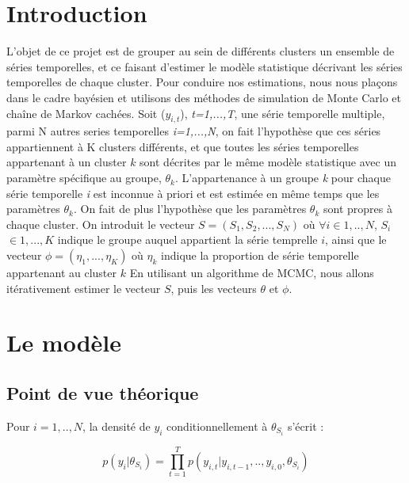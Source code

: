 \section{Introduction}
L'objet de ce projet est de grouper au sein de différents clusters un ensemble de séries temporelles, et ce faisant d'estimer le modèle statistique décrivant les séries temporelles de chaque cluster. 
Pour conduire nos estimations, nous nous plaçons dans le cadre bayésien et utilisons des méthodes de simulation de Monte Carlo et chaîne de Markov cachées.
\newline
Soit ($y_{i,t}$), \textit{t=1,...,T}, une série temporelle multiple, parmi N autres series temporelles \textit{i=1,...,N}, on fait l'hypothèse que ces séries appartiennent à K clusters différents, et que toutes les séries temporelles appartenant à un cluster $\textit{k}$ sont décrites par le même modèle statistique avec un paramètre spécifique au groupe, $\theta_k$. L'appartenance à un groupe \textit{k} pour chaque série temporelle \textit{i} est inconnue à priori et est estimée en même temps que les paramètres $\theta_k$. On fait de plus l'hypothèse que les paramètres $\theta_k$ sont propres à chaque cluster. 
\newline
On introduit le vecteur $S = (S_1,S_2,...,S_N)$ où $\forall i \in 1,..,N$, $S_i$ $\in 1,...,K$ indique le groupe auquel appartient la série temprelle $i$, ainsi que le vecteur $\phi = (\eta_1, ..., \eta_K)$ où $\eta_k$ indique la proportion de série temporelle appartenant au cluster $k$
\newline
En utilisant un algorithme de MCMC, nous allons itérativement estimer le vecteur $S$, puis les vecteurs $\theta$ et $\phi$.

\section{Le modèle}
\subsection{Point de vue théorique}

Pour $i = 1,..,N$, la densité de $y_i$ conditionnellement à $\theta_{S_i}$ s'écrit :

\begin{equation}
\textit{$p(y_i | \theta_{S_i})$} = \prod_{t=1}^{T} \textit{$p(y_{i,t}|y_{i,t-1},..,y_{i,0},\theta_{S_i})$}
\end{equation}

